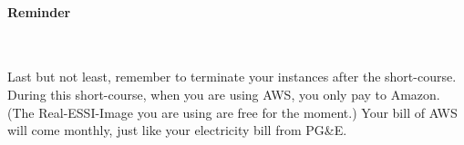 \paragraph{Reminder} ~

Last but not least, remember to terminate your instances after the short-course. 
During this short-course, when you are using AWS, you only pay to Amazon. (The Real-ESSI-Image you are using are free for the moment.)
Your bill of AWS will come monthly, just like your electricity bill from PG\&E.






